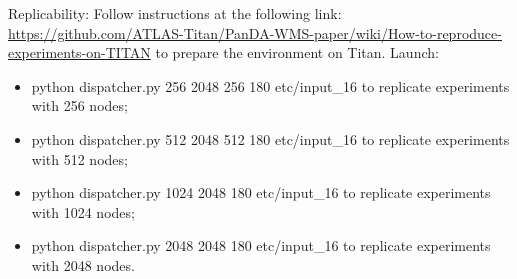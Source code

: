 Replicability: Follow instructions at the following link: \url{https://github.com/ATLAS-Titan/PanDA-WMS-paper/wiki/How-to-reproduce-experiments-on-TITAN} to prepare the environment on Titan.
Launch:
\begin{itemize}
\item python dispatcher.py 256  2048 256 180 etc/input\_16 to replicate experiments with 256 nodes;
\item python dispatcher.py 512 2048 512 180 etc/input\_16 to replicate experiments with 512 nodes;
\item python dispatcher.py 1024 2048 180 etc/input\_16 to replicate experiments with 1024 nodes;
\item python dispatcher.py 2048 2048 180 etc/input\_16 to replicate experiments with 2048 nodes.
\end{itemize}




